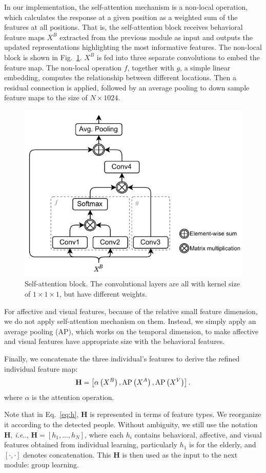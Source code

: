 \documentclass[VANCOUVER,STIX1COL]{WileyNJD-v2}
\makeatletter
\DeclareRobustCommand\onedot{\futurelet\@let@token\@onedot}
\def\@onedot{\ifx\@let@token.\else.\null\fi\xspace}
\def\ie{\emph{i.e}\onedot}
\makeatother
\begin{document}
In our implementation, the self-attention mechanism is a non-local operation, which calculates the response at a given position as a weighted sum of the features at all positions. That is, the self-attention block receives behavioral feature maps $X^B$ extracted from the previous module as input and outputs the updated representations highlighting the most informative features. The non-local block is shown in Fig.~\ref{f:self-attention}. $X^B$ is fed into three separate convolutions to embed the feature map. The non-local operation $f$, together with $g$, a simple linear embedding, computes the relationship between different locations. Then a residual connection is applied, followed by an average pooling to down sample feature maps to the size of $N\times1024$.

\begin{figure}[t]
  \centering
  \includegraphics[width=0.6\linewidth]{assets/self-attention.drawio}
  \caption{Self-attention block. The convolutional layers are all with kernel size of $1\times1\times1$, but have different weights.}
  \label{f:self-attention}
\end{figure}

For affective and visual features, because of the relative small feature dimension, we do not apply self-attention mechanism on them. Instead, we simply apply an average pooling (AP), which works on the temporal dimension, to make affective and visual features have appropriate size with the behavioral features.

Finally, we concatenate the three individual's features to derive the refined individual feature map:
\begin{equation}
\label{eq:h}
  \mathbf{H} = \left[\alpha\left(X^B\right), {\rm AP}\left(X^A\right), {\rm AP}\left(X^V\right)\right].
\end{equation}
where $\alpha$ is the attention operation.

Note that in Eq.~\ref{eq:h}, $\mathbf{H}$ is represented in terms of feature types. We reorganize it according to the detected people. Without ambiguity, we still use the notation $\mathbf{H}$, \ie, $\mathbf{H} = \left[h_1, ..., h_N\right]$, where each $h_i$ contains behavioral, affective, and visual features obtained from individual learning, particularly $h_1$ is for the elderly, and $\left[\cdot, \cdot\right]$ denotes concatenation. This $\mathbf{H}$ is then used as the input to the next module: group learning.
\end{document}
